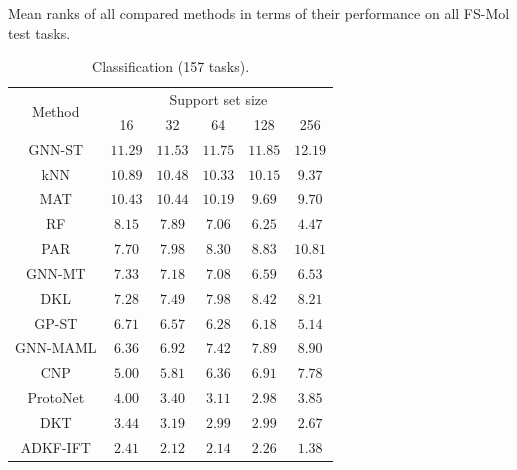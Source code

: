         \begin{table}
            \scriptsize
            \caption{{\color{black}Mean ranks of all compared methods in terms of their performance on all FS-Mol test tasks.}}
            \label{tab:ranking}
            \begin{subtable}{.49\linewidth}
                \caption{Classification (157 tasks).}
                \centering
                \setlength\extrarowheight{-3pt}
                \begin{tabular}{cccccc}
                    \toprule
                    \multirow{2}[3]{*}{Method} & \multicolumn{5}{c}{Support set size}\\
                    \cmidrule(lr){2-6}
                    & 16 & 32 & 64 & 128 & 256 \\
                    \midrule
                    GNN-ST & $11.29$ & $11.53$ & $11.75$ & $11.85$ & $12.19$ \\
                    kNN & $10.89$ & $10.48$ & $10.33$ & $10.15$ & $9.37$ \\
                    MAT & $10.43$ & $10.44$ & $10.19$ & $9.69$ & $9.70$ \\
                    RF & $8.15$ & $7.89$ & $7.06$ & $6.25$ & $4.47$ \\
                    PAR & $7.70$ & $7.98$ & $8.30$ & $8.83$ & $10.81$ \\
                    GNN-MT & $7.33$ & $7.18$ & $7.08$ & $6.59$ & $6.53$ \\
                    DKL & $7.28$ & $7.49$ & $7.98$ & $8.42$ & $8.21$ \\
                    GP-ST & $6.71$ & $6.57$ & $6.28$ & $6.18$ & $5.14$ \\
                    GNN-MAML & $6.36$ & $6.92$ & $7.42$ & $7.89$ & $8.90$ \\
                    CNP & $5.00$ & $5.81$ & $6.36$ & $6.91$ & $7.78$ \\ 
                    ProtoNet & $4.00$ & $3.40$ & $3.11$ & $2.98$ & $3.85$ \\
                    DKT & $3.44$ & $3.19$ & $2.99$ & $2.99$ & $2.67$ \\
                    ADKF-IFT & $\mathbf{2.41}$ & $\mathbf{2.12}$ & $\mathbf{2.14}$ & $\mathbf{2.26}$ & $\mathbf{1.38}$ \\
                    \bottomrule
                \end{tabular}
            \end{subtable}
            \hfill
            \begin{subtable}{.49\linewidth}

\end{subtable}
\end{table}
